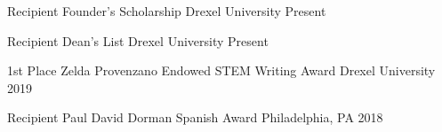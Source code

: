 



\begin{cvhonors}

  \cvhonor
    {Recipient} %
    {Founder's Scholarship} %
    {Drexel University} %
    {Present} %

  \cvhonor
    {Recipient} %
    {Dean's List} %
    {Drexel University} %
    {Present} %

  \cvhonor
    {1st Place} %
    {Zelda Provenzano Endowed STEM Writing Award} %
    {Drexel University} %
    {2019} %

  \cvhonor
    {Recipient} %
    {Paul David Dorman Spanish Award} %
    {Philadelphia, PA} %
    {2018} %

\end{cvhonors}

